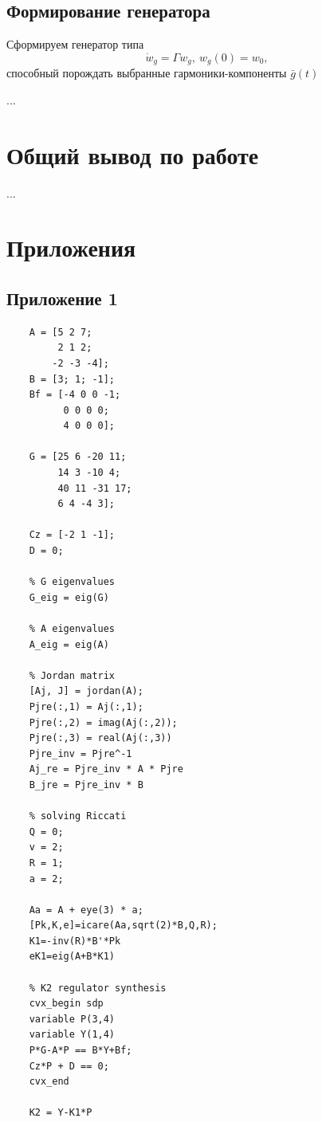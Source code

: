 \documentclass[a4paper, 12pt]{article}
\begin{document}
    \subsection{Формирование генератора}
    Сформируем генератор типа
    $$
    \dot{w}_g=\Gamma w_g,\ w_g(0)=w_0,
    $$
    способный порождать выбранные гармоники-компоненты $\bar{g}(t)$


    ...


    \section{Общий вывод по работе}
    ...


    \section{Приложения}
    \subsection{Приложение 1}
    \begin{lstlisting}[label=task1, caption={Программа для задания 1}]
    % plant parameters
    A = [5 2 7;
         2 1 2;
        -2 -3 -4];
    B = [3; 1; -1];
    Bf = [-4 0 0 -1;
          0 0 0 0;
          4 0 0 0];

    G = [25 6 -20 11;
         14 3 -10 4;
         40 11 -31 17;
         6 4 -4 3];

    Cz = [-2 1 -1];
    D = 0;

    % G eigenvalues
    G_eig = eig(G)

    % A eigenvalues
    A_eig = eig(A)

    % Jordan matrix
    [Aj, J] = jordan(A);
    Pjre(:,1) = Aj(:,1);
    Pjre(:,2) = imag(Aj(:,2));
    Pjre(:,3) = real(Aj(:,3))
    Pjre_inv = Pjre^-1
    Aj_re = Pjre_inv * A * Pjre
    B_jre = Pjre_inv * B

    % solving Riccati
    Q = 0;
    v = 2;
    R = 1;
    a = 2;

    Aa = A + eye(3) * a;
    [Pk,K,e]=icare(Aa,sqrt(2)*B,Q,R);
    K1=-inv(R)*B'*Pk
    eK1=eig(A+B*K1)

    % K2 regulator synthesis
    cvx_begin sdp
    variable P(3,4)
    variable Y(1,4)
    P*G-A*P == B*Y+Bf;
    Cz*P + D == 0;
    cvx_end

    K2 = Y-K1*P
    \end{lstlisting}
\end{document}

